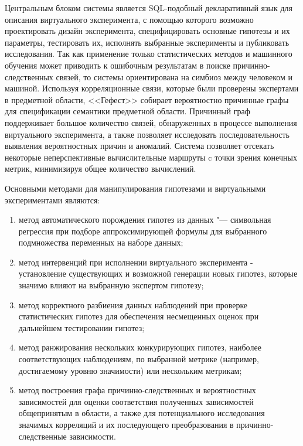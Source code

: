 Центральным блоком системы является SQL-подобный декларативный язык для описания виртуального эксперимента, 
с помощью которого возможно проектировать дизайн эксперимента, специфицировать основные гипотезы и их параметры, 
тестировать их, исполнять выбранные эксперименты и публиковать исследования. Так как применение только статистических 
методов и машинного обучения может приводить к ошибочным результатам в поиске причинно-следственных связей, то системы 
ориентирована на симбиоз между человеком и машиной. Используя корреляционные связи, которые были проверены экспертами 
в предметной области, <<Гефест>> собирает вероятностно причинные графы для спецификации семантики предметной области. 
Причинный граф поддерживает большое количество связей, обнаруженных в процессе выполнения виртуального эксперимента, 
а также позволяет исследовать последовательность выявления вероятностных причин и аномалий. Система позволяет отсекать 
некоторые неперспективные вычислительные маршруты c точки зрения конечных метрик, 
минимизируя общее количество вычислений.

Основными методами для манипулирования гипотезами и виртуальными экспериментами являются:
\begin{enumerate}
    \item метод автоматического порождения гипотез из данных "--- символьная регрессия при подборе аппроксимирующей 
            формулы для выбранного подмножества переменных на наборе данных;
    \item метод интервенций при исполнении виртуального эксперимента - установление существующих и возможной 
            генерации новых гипотез, которые значимо влияют на выбранную экспертом гипотезу;
    \item метод корректного разбиения данных наблюдений при проверке статистических гипотез для обеспечения 
            несмещенных оценок при дальнейшем тестировании гипотез;
    \item метод ранжирования нескольких конкурирующих гипотез, наиболее соответствующих наблюдениям, 
            по выбранной метрике (например, достигаемому уровню значимости) или нескольким метрикам;
    \item метод построения графа причинно-следственных и вероятностных зависимостей для оценки соответствия 
            полученных зависимостей общепринятым в области, а также для потенциального исследования значимых 
            корреляций и их последующего преобразования в причинно-следственные зависимости.
\end{enumerate}

